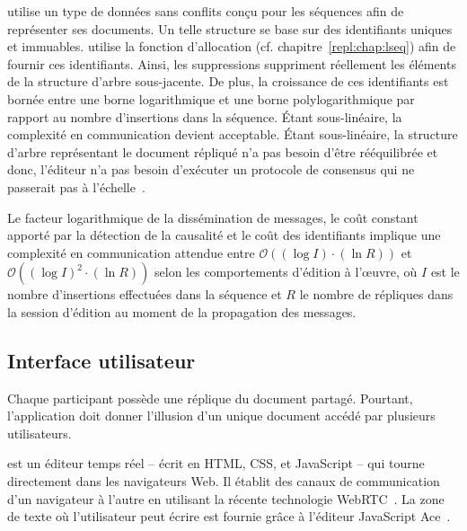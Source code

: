 \CRATE utilise un type de données sans conflits conçu pour les
séquences afin de représenter ses documents. Un telle structure se base sur des
identifiants uniques et immuables. \CRATE utilise la fonction d'allocation \LSEQ
(cf. chapitre~\ref{repl:chap:lseq}) afin de fournir ces identifiants. Ainsi, les
suppressions suppriment réellement les éléments de la structure d'arbre
sous-jacente. De plus, la croissance de ces identifiants est bornée entre une
borne logarithmique et une borne polylogarithmique par rapport au nombre
d'insertions dans la séquence. Étant sous-linéaire, la complexité en
communication devient acceptable. Étant sous-linéaire, la structure d'arbre
représentant le document répliqué n'a pas besoin d'être rééquilibrée et donc,
l'éditeur n'a pas besoin d'exécuter un protocole de consensus qui ne passerait
pas à l'échelle~\cite{mostefaoui2015signature}.

Le facteur logarithmique de la dissémination de messages, le coût constant
apporté par la détection de la causalité et le coût des identifiants implique
une complexité en communication attendue entre
$\mathcal{O}((\log I)\cdot (\ln R))$ et $\mathcal{O}((\log I)^2\cdot(\ln R))$
selon les comportements d'édition à l'œuvre, où $I$ est le nombre d'insertions
effectuées dans la séquence et $R$ le nombre de répliques dans la session
d'édition au moment de la propagation des messages.


\subsection{Interface utilisateur}

Chaque participant possède une réplique du document partagé. Pourtant,
l'application doit donner l'illusion d'un unique document accédé par plusieurs
utilisateurs.

\CRATE est un éditeur temps réel -- écrit en HTML, CSS, et JavaScript -- qui
tourne directement dans les navigateurs Web. Il établit des canaux de
communication d'un navigateur à l'autre en utilisant la récente technologie
WebRTC~\cite{webrtc}. La zone de texte où l'utilisateur peut écrire est fournie
grâce à l'éditeur JavaScript Ace~\cite{ace}.



